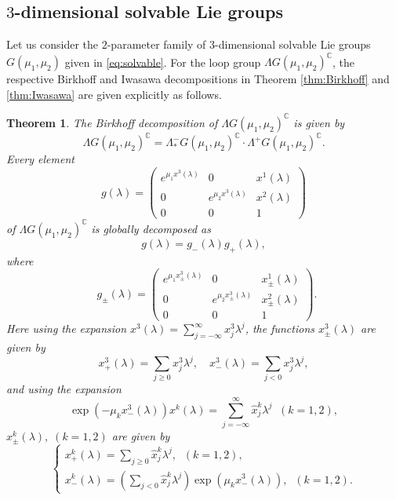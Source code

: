 \documentclass[12pt]{amsart}
\newtheorem{Theorem}{Theorem}[section]
\theoremstyle{definition}
\theoremstyle{remark}
\numberwithin{equation}{section}
\begin{document}
\subsection{$3$-dimensional solvable Lie groups}
 Let us consider the $2$-parameter family of $3$-dimensional solvable Lie groups 
 $G(\mu_1, \mu_2)$ given in \eqref{eq:solvable}. 
 For the loop group $\Lambda G(\mu_1, \mu_2)^{\mathbb C}$, 
 the respective Birkhoff and Iwasawa decompositions 
 in Theorem \ref{thm:Birkhoff} and \ref{thm:Iwasawa} 
 are given explicitly  as follows.
\begin{Theorem}\label{thm:BirkhoffGmu}
 The Birkhoff decomposition of $\Lambda G(\mu_1,\mu_2)^{\mathbb{C}}$ is 
 given by 
\begin{equation*}
\Lambda G(\mu_1,\mu_2)^{\mathbb{C}}
=
\Lambda^{-}_{*} G(\mu_1,\mu_2)^{\mathbb{C}}\cdot
\Lambda^{+} G(\mu_1,\mu_2)^{\mathbb{C}}.
\end{equation*}
 Every element 
\begin{equation*}
 g({\lambda}) = 
 \begin{pmatrix}
 e^{\mu_1 x^3({\lambda})} & 0 & x^1({\lambda})  \\
 0 & e^{\mu_2 x^3({\lambda})}  & x^2({\lambda})  \\
 0 & 0 & 1
 \end{pmatrix}
\end{equation*}
 of $\Lambda G(\mu_1,\mu_2)^{\mathbb{C}}$
 is globally decomposed as
\begin{equation*}
 g(\lambda)= g_{-} ({\lambda}) g_{+} ({\lambda}),
\end{equation*}
where 
\begin{equation*}
\;\;
g_{\pm}({\lambda}) =
\begin{pmatrix}
 e^{\mu_1 x_{\pm}^3 ({\lambda})} & 0 & x_{\pm}^1 ({\lambda}) \\
 0 & e^{\mu_2 x_{\pm}^3 ({\lambda})} & x^2_{\pm} ({\lambda}) \\
 0 & 0 & 1 
\end{pmatrix}.
\end{equation*}
 Here using 
 the expansion $x^3({\lambda}) = \sum_{j=-\infty}^{\infty} x_j^3 {\lambda}^j$,
 the functions $x^3_{\pm}({\lambda})$ are given by
\begin{equation*}
 x^{3}_{+}({\lambda}) =\sum_{j\geq 0}x^{3}_{j}{\lambda}^j,
 \quad x^{3}_{-}({\lambda})=\sum_{j< 0}x^{3}_{j}{\lambda}^{j},
\end{equation*}
 and  using the expansion
\begin{equation*}
 \exp\left(- \mu_k x^3_{-}({\lambda}) \right) x^k({\lambda})
 = \sum_{j=-\infty}^{\infty} \hat x_j^k {\lambda}^j\;\;(k =1, 2),
\end{equation*}
 $x^k_{\pm}({\lambda}), \;(k=1, 2)$ are given by
\begin{equation*}
\left\{
\begin{array}{l}
 x^{k}_{+}({\lambda}) =\sum_{j\geq 0}\hat x^{k}_{j}{\lambda}^{j},\;\;(k=1, 2), \\[0.1cm]
 x^{k}_{-}({\lambda})=(\sum_{j< 0}\hat x^{k}_{j}{\lambda}^{j})\exp(\mu_k x^3_{-}({\lambda})), \;\;(k=1, 2).
\end{array}
\right.
\end{equation*}
\end{Theorem}
\end{document}
